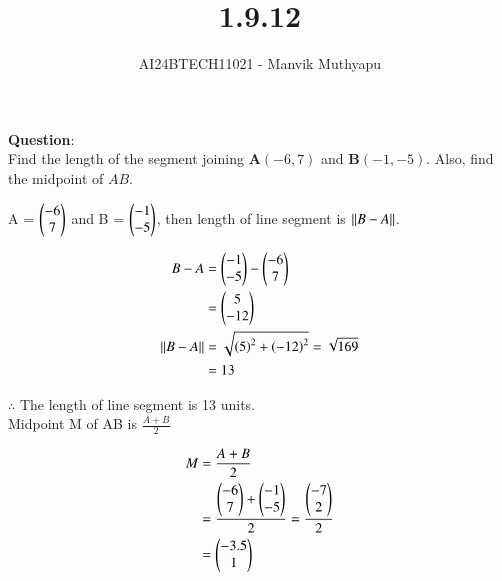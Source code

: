 \documentclass[journal,12pt,onecolumn]{IEEEtran}
\title{1.9.12}
\author{AI24BTECH11021 - Manvik Muthyapu}
\theoremstyle{remark}
\begin{document}


\maketitle
\bigskip

\renewcommand{\thefigure}{\theenumi}
\renewcommand{\thetable}{\theenumi}


\textbf{Question}:\\

Find the length of the segment joining $\textbf{A}(-6,7)$ and $\textbf{B}(-1,-5)$. Also, find the midpoint of $AB$.
\hfill {}\\

\solution

A = $\begin{pmatrix}-6\\7\end{pmatrix}$ and B = $\begin{pmatrix}-1\\-5\end{pmatrix}$, then length of line segment is $\left\lVert B-A\right\rVert$.

\begin{align}
	B-A &= \begin{pmatrix}-1\\-5\end{pmatrix}-\begin{pmatrix}-6\\7\end{pmatrix}\\
            &= \begin{pmatrix}5\\-12\end{pmatrix}\\
	\left\lVert B-A\right\rVert &= \sqrt{\left(5\right)^2 + \left(-12\right)^2} = \sqrt{169}\\
	    &= 13
\end{align}

$\therefore$ The length of line segment is 13 units.\\

Midpoint M of AB is $\frac{A+B}{2}$

\begin{align}
	M &= \frac{A+B}{2}\\
	  &= \frac{\begin{pmatrix}-6\\7\end{pmatrix} + \begin{pmatrix}-1\\-5\end{pmatrix}}{2} = \frac{\begin{pmatrix}-7\\2\end{pmatrix}}{2}\\
	  &= \begin{pmatrix}-3.5\\1\end{pmatrix}
\end{align}
\end{document}
